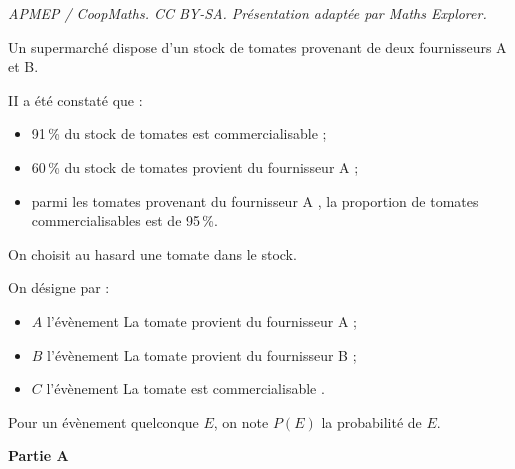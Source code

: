 \documentclass[10pt]{article}
\begin{document}
\noindent\textit{APMEP / CoopMaths. CC BY-SA. Présentation adaptée par Maths Explorer.}\par\medskip
Un supermarché dispose d'un stock de tomates provenant de deux fournisseurs A et B.

II a été constaté que :

\begin{itemize}[label=$\bullet~$]
\item 91\,\% du stock de tomates est commercialisable ;
\item 60\,\% du stock de tomates provient du fournisseur A ;
\item parmi les tomates provenant du fournisseur A , la proportion de tomates commercialisables
est de 95\,\%.
\end{itemize}

On choisit au hasard une tomate dans le stock.

On désigne par :
\begin{itemize}[label=$\bullet~$]
\item $A$ l'évènement \og La tomate provient du fournisseur A \fg ;
\item $B$ l'évènement \og La tomate provient du fournisseur B \fg ;
\item $C$ l'évènement \og La tomate est commercialisable \fg.
\end{itemize}

Pour un évènement quelconque $E$, on note $P(E)$ la probabilité de $E$.

\medskip

\textbf{Partie A}

\medskip
\end{document}
